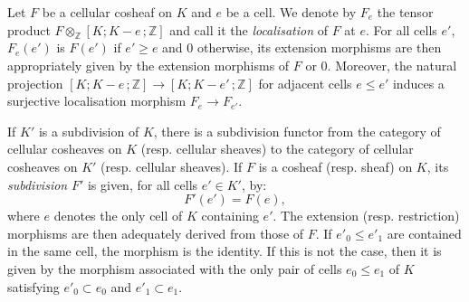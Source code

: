 \documentclass[AHL,Unicode,longabstracts,published]{cedram}
\newcommand{\Z}{\mathbb{Z}}
\begin{document}
\begin{defi}
Let $F$ be a cellular cosheaf on $K$ and $e$ be a cell. We denote by $F_e$ the tensor product $F\otimes_\Z[K;K-e\,;\Z]$ and call it the \emph{localisation} of $F$ at $e$. For all cells $e'$, $F_e(e')$ is $F(e')$ if $e'\geq e$ and $0$ otherwise, its extension morphisms are then appropriately given by the extension morphisms of $F$ or $0$. Moreover, the natural projection $[K;K-e\,;\Z]\rightarrow [K;K-e'\,;\Z]$ for adjacent cells $e\leq e'$ induces a surjective localisation morphism $F_e\rightarrow F_{e'}$.
\end{defi}

\begin{defi}[Subdivision]\label{definition:subd}
If $K'$ is a subdivision of $K$, there is a subdivision functor from the category of cellular cosheaves on $K$ (resp. cellular sheaves) to the category of cellular cosheaves on $K'$ (resp. cellular sheaves). If $F$ is a cosheaf (resp. sheaf) on $K$, its \emph{subdivision} $F'$ is given, for all cells $e'\in K'$, by:
\begin{equation*}
F'(e')=F(e),
\end{equation*}
where $e$ denotes the only cell of $K$ containing $e'$. The extension (resp. restriction) morphisms are then adequately derived from those of $F$. If $e'_0\leq e'_1$ are contained in the same cell, the morphism is the identity. If this is not the case, then it is given by the morphism associated with the only pair of cells $e_0\leq e_1$ of $K$ satisfying $e'_0\subset e_0$ and $e'_1\subset e_1$.
\end{defi}
\end{document}
